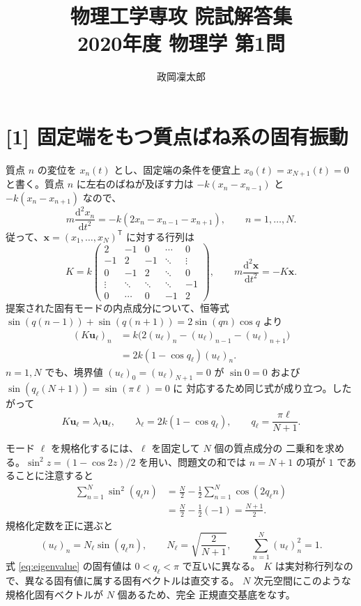 \documentclass[11pt,a4paper]{article}
\title{物理工学専攻 院試解答集\\2020年度 物理学 第1問}
\author{政岡凜太郎}
\date{}
\begin{document}
\maketitle

\section*{[1] 固定端をもつ質点ばね系の固有振動}
質点 $n$ の変位を $x_n(t)$ とし、固定端の条件を便宜上
$x_0(t)=x_{N+1}(t)=0$ と書く。質点 $n$ に左右のばねが及ぼす力は
$-k(x_n-x_{n-1})$ と $-k(x_n-x_{n+1})$ なので、
\begin{equation}
  m\frac{\mathrm{d}^2x_n}{\mathrm{d}t^2}
  =-k(2x_n-x_{n-1}-x_{n+1}),\qquad n=1,\ldots,N.
  \label{eq:motion-components}
\end{equation}
従って、$\boldsymbol{x}=(x_1,\ldots,x_N)^\mathsf{T}$ に対する行列は
\begin{equation}
 K=k\begin{pmatrix}
 2&-1&0&\cdots&0\\
 -1&2&-1&\ddots&\vdots\\
 0&-1&2&\ddots&0\\
 \vdots&\ddots&\ddots&\ddots&-1\\
 0&\cdots&0&-1&2
 \end{pmatrix},\qquad
 m\frac{\mathrm{d}^2\boldsymbol{x}}{\mathrm{d}t^2}=-K\boldsymbol{x}.
 \label{eq:K}
\end{equation}
提案された固有モードの内点成分について、恒等式
$\sin(q(n-1))+\sin(q(n+1))=2\sin(qn)\cos q$ より
\begin{align}
 (K\boldsymbol{u}_\ell)_n
 &=k\bigl(2(u_\ell)_n-(u_\ell)_{n-1}-(u_\ell)_{n+1}\bigr)\\
 &=2k(1-\cos q_\ell)(u_\ell)_n.
\end{align}
$n=1,N$ でも、境界値 $(u_\ell)_0=(u_\ell)_{N+1}=0$ が
$\sin 0=0$ および $\sin(q_\ell(N+1))=\sin(\pi\ell)=0$ に
対応するため同じ式が成り立つ。したがって
\begin{equation}
  K\boldsymbol{u}_\ell=\lambda_\ell\boldsymbol{u}_\ell,
  \qquad \lambda_\ell=2k(1-\cos q_\ell),
  \qquad q_\ell=\frac{\pi\ell}{N+1}.
  \label{eq:eigenvalue}
\end{equation}

モード $\ell$ を規格化するには、$\ell$ を固定して $N$ 個の質点成分の
二乗和を求める。$\sin^2 z=(1-\cos 2z)/2$ を用い、問題文の和では
$n=N+1$ の項が $1$ であることに注意すると
\begin{align}
 \sum_{n=1}^{N}\sin^2(q_\ell n)
 &=\frac{N}{2}-\frac12\sum_{n=1}^{N}\cos(2q_\ell n)\\
 &=\frac{N}{2}-\frac12(-1)=\frac{N+1}{2}.
\end{align}
規格化定数を正に選ぶと
\begin{equation}
  (u_\ell)_n=N_\ell\sin(q_\ell n),\qquad
  N_\ell=\sqrt{\frac{2}{N+1}},\qquad
  \sum_{n=1}^{N}(u_\ell)_n^2=1.
  \label{eq:normalization}
\end{equation}
式 \eqref{eq:eigenvalue} の固有値は $0<q_\ell<\pi$ で互いに異なる。
$K$ は実対称行列なので、異なる固有値に属する固有ベクトルは直交する。
$N$ 次元空間にこのような規格化固有ベクトルが $N$ 個あるため、完全
正規直交基底をなす。
\end{document}
